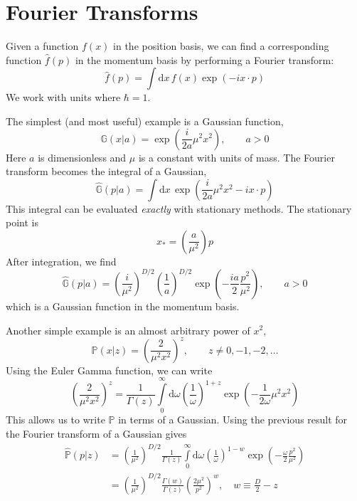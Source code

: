 \chapter{Fourier Transforms\label{AppFourier}}
Given a function $f(x)$ in the position basis, we can find a corresponding function $\hat{f}(p)$ in the momentum basis by performing a Fourier transform:
\begin{equation}
	\hat{f}(p) = \int \mathrm{d}x \, f(x) \exp{\left( - i x \cdot p \right)}
\end{equation}
We work with units where $\hbar = 1$.

The simplest (and most useful) example is a Gaussian function,
\begin{equation}
	\mathbb{G}(x|a) = \exp{\left( \frac{i}{2a} \mu^{2} x^{2} \right)}, \qquad a > 0
\end{equation}
Here $a$ is dimensionless and $\mu$ is a constant with units of mass. The Fourier transform becomes the integral of a Gaussian,
\begin{equation}
	\hat{\mathbb{G}}(p|a) = \int \mathrm{d}x \, \exp{\left(\frac{i}{2a} \mu^{2} x^{2} - i x \cdot p \right)}
\end{equation}
This integral can be evaluated \textit{exactly} with stationary methods. The stationary point is
\begin{equation}
	x_{*} = \left( \frac{a}{\mu^{2}} \right) p
\end{equation}
After integration, we find
\begin{equation}
	\hat{\mathbb{G}}(p|a) = \left( \frac{i}{\mu^{2}} \right)^{D/2} \left( \frac{1}{a} \right)^{D/2} \exp{\left( - \frac{i a}{2} \frac{p^{2}}{\mu^{2}} \right)}, \qquad a > 0
\end{equation}
which is a Gaussian function in the momentum basis.

Another simple example is an almost arbitrary power of $x^{2}$,
\begin{equation}
	\mathbb{P}(x|z) = \left( \frac{2}{\mu^{2} x^{2}} \right)^{z}, \qquad z \neq 0, {-1}, {-2}, \ldots
\end{equation}
Using the Euler Gamma function, we can write
\begin{equation}
	\left(\frac{2}{\mu^{2} x^{2}} \right)^{z} = \frac{1}{\Gamma(z)} \int\limits_{0}^{\infty} \mathrm{d}\omega \left( \frac{1}{\omega} \right)^{1 + z} \exp{\left(- \frac{1}{2\omega} \mu^{2} x^{2} \right)}
\end{equation}
This allows us to write $\mathbb{P}$ in terms of a Gaussian. Using the previous result for the Fourier transform of a Gaussian gives
\begin{align}
	\hat{\mathbb{P}}(p|z) &= \left( \frac{1}{\mu^{2}} \right)^{D/2} \frac{1}{\Gamma(z)} \int\limits_{0}^{\infty} \mathrm{d}\omega \left( \frac{1}{\omega} \right)^{1 - w} \exp{\left( - \frac{\omega}{2} \frac{p^{2}}{\mu^{2}} \right)} \nonumber \\
	&= \left( \frac{1}{\mu^{2}} \right)^{D/2} \frac{\Gamma(w)}{\Gamma(z)} \left( \frac{2 \mu^{2}}{p^{2}} \right)^{w}, \quad w \equiv \frac{D}{2} - z
\end{align}